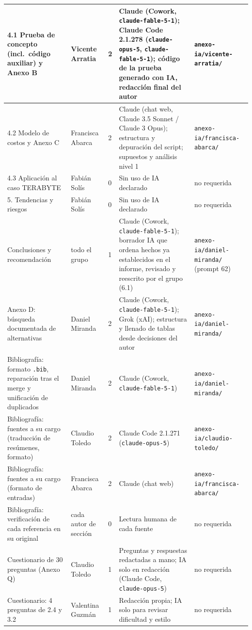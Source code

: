 \documentclass[12pt, letterpaper, table, xcdraw]{inf-pucv}
\begin{document}
{\begin{longtable}{|p{4.2cm}|p{2.2cm}|p{0.9cm}|p{4.2cm}|p{2.4cm}|}
    4.1 Prueba de concepto (incl.\ código auxiliar) y Anexo B & Vicente Arratia & 2 & Claude (Cowork, \texttt{claude-fable-5-1}); Claude Code 2.1.278 (\texttt{claude-opus-5}, \texttt{claude-fable-5-1}); código de la prueba generado con IA, redacción final del autor & \texttt{anexo-ia/vicente-arratia/} \\ \hline
    4.2 Modelo de costos y Anexo C & Francisca Abarca & 2 & Claude (chat web, Claude 3.5 Sonnet / Claude 3 Opus); estructura y depuración del script; supuestos y análisis nivel 1 & \texttt{anexo-ia/francisca-abarca/} \\ \hline
    4.3 Aplicación al caso TERABYTE & Fabián Solís & 0 & Sin uso de IA declarado & no requerida \\ \hline
    5. Tendencias y riesgos & Fabián Solís & 0 & Sin uso de IA declarado & no requerida \\ \hline
    Conclusiones y recomendación & todo el grupo & 1 & Claude (Cowork, \texttt{claude-fable-5-1}); borrador IA que ordena hechos ya establecidos en el informe, revisado y reescrito por el grupo (6.1) & \texttt{anexo-ia/daniel-miranda/} (prompt 62) \\ \hline
    Anexo D: búsqueda documentada de alternativas & Daniel Miranda & 2 & Claude (Cowork, \texttt{claude-fable-5-1}); Grok (xAI); estructura y llenado de tablas desde decisiones del autor & \texttt{anexo-ia/daniel-miranda/} \\ \hline
    Bibliografía: formato \texttt{.bib}, reparación tras el merge y unificación de duplicados & Daniel Miranda & 2 & Claude (Cowork, \texttt{claude-fable-5-1}) & \texttt{anexo-ia/daniel-miranda/} \\ \hline
    Bibliografía: fuentes a su cargo (traducción de resúmenes, formato) & Claudio Toledo & 2 & Claude Code 2.1.271 (\texttt{claude-opus-5}) & \texttt{anexo-ia/claudio-toledo/} \\ \hline
    Bibliografía: fuentes a su cargo (formato de entradas) & Francisca Abarca & 2 & Claude (chat web) & \texttt{anexo-ia/francisca-abarca/} \\ \hline
    Bibliografía: verificación de cada referencia en su original & cada autor de sección & 0 & Lectura humana de cada fuente & no requerida \\ \hline
    Cuestionario de 30 preguntas (Anexo Q) & Claudio Toledo & 1 & Preguntas y respuestas redactadas a mano; IA solo en redacción (Claude Code, \texttt{claude-opus-5}) & no requerida \\ \hline
    Cuestionario: 4 preguntas de 2.4 y 3.2 & Valentina Guzmán & 1 & Redacción propia; IA solo para revisar dificultad y estilo & no requerida \\ \hline

\end{longtable}}
\end{document}

